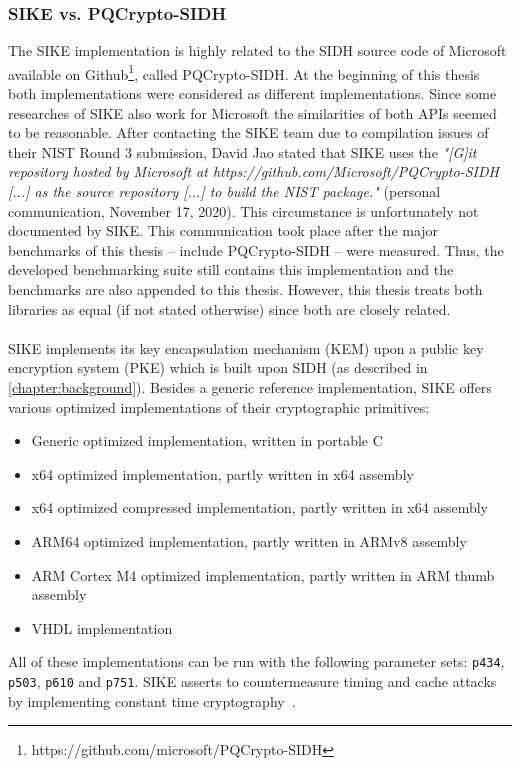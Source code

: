 \subsubsection{SIKE vs. PQCrypto-SIDH}\label{existing:sike_vs_pqcrypto}
The \gls{SIKE} implementation is highly related to the \gls{SIDH} source code of Microsoft available on Github\footnote{https://github.com/microsoft/PQCrypto-SIDH}, called \gls{PQCrypto-SIDH}. At the beginning of this thesis both implementations were considered as different implementations. Since some researches of \gls{SIKE} also work for Microsoft the similarities of both APIs seemed to be reasonable. After contacting the \gls{SIKE} team due to compilation issues of their NIST Round 3 submission, David Jao stated that \gls{SIKE} uses the \textit{"[G]it repository hosted by Microsoft at
https://github.com/Microsoft/PQCrypto-SIDH [...] as the source
repository [...] to build the NIST package."} (personal communication, November 17, 2020). This circumstance is unfortunately not documented by \gls{SIKE}. This communication took place after the major benchmarks of this thesis -- include \gls{PQCrypto-SIDH} -- were measured. Thus, the developed benchmarking suite still contains this implementation and the benchmarks are also appended to this thesis. However, this thesis treats both libraries as equal (if not stated otherwise) since both are closely related.
\\\\
\gls{SIKE} implements its key encapsulation mechanism (\gls{KEM}) upon a public key encryption system (\gls{PKE}) which is built upon \gls{SIDH} (as described in \autoref{chapter:background}). Besides a generic reference implementation, \gls{SIKE} offers various optimized implementations of their cryptographic primitives:
\begin{itemize}
  \item Generic optimized implementation, written in portable C
  \item x64 optimized implementation, partly written in x64 assembly
  \item x64 optimized compressed implementation, partly written in x64 assembly
  \item ARM64 optimized implementation, partly written in ARMv8 assembly
  \item ARM Cortex M4 optimized implementation, partly written in ARM thumb assembly
  \item VHDL implementation
\end{itemize}
All of these implementations can be run with the following parameter sets: \texttt{p434}, \texttt{p503}, \texttt{p610} and \texttt{p751}. \gls{SIKE} asserts to countermeasure timing and cache attacks by implementing constant time cryptography~\parencite{sike2020spec}.

